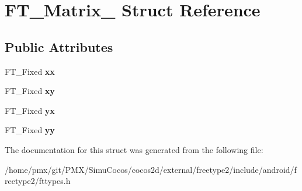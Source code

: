 \hypertarget{structFT__Matrix__}{}\section{F\+T\+\_\+\+Matrix\+\_\+ Struct Reference}
\label{structFT__Matrix__}
\subsection*{Public Attributes}
\begin{DoxyCompactItemize}
\item 
\mbox{\label{structFT__Matrix___a27d51c2958634abe7bf377610e095f74}} 
F\+T\+\_\+\+Fixed {\bfseries xx}
\item 
\mbox{\label{structFT__Matrix___a7e9f439d37c00ba1a11919bcaa8937a2}} 
F\+T\+\_\+\+Fixed {\bfseries xy}
\item 
\mbox{\label{structFT__Matrix___a55792583a843a1611b43c40534a02a17}} 
F\+T\+\_\+\+Fixed {\bfseries yx}
\item 
\mbox{\label{structFT__Matrix___a689a6fd20a88238788b90c3597ee0c2a}} 
F\+T\+\_\+\+Fixed {\bfseries yy}
\end{DoxyCompactItemize}


The documentation for this struct was generated from the following file\+:\begin{DoxyCompactItemize}
\item 
/home/pmx/git/\+P\+M\+X/\+Simu\+Cocos/cocos2d/external/freetype2/include/android/freetype2/fttypes.\+h\end{DoxyCompactItemize}
